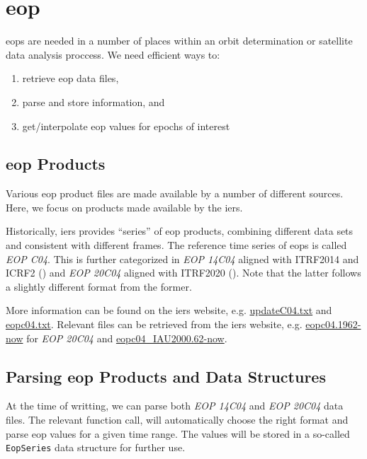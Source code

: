 \section{\gls{eop}}\label{sec:eop}

\glspl{eop} are needed in a number of places within an orbit determination or 
satellite data analysis proccess. We need efficient ways to:
\begin{enumerate}
  \item retrieve \gls{eop} data files, 
  \item parse and store information, and 
  \item get/interpolate \gls{eop} values for epochs of interest
\end{enumerate}

\subsection{\gls{eop} Products}\label{ssec:eop-products}

Various \gls{eop} product files are made available by a number of different 
sources. Here, we focus on products made available by the \gls{iers}. 

Historically, \gls{iers} provides ``series'' of \gls{eop} products, combining 
different data sets and consistent with different frames. The reference time 
series of \glspl{eop} is called \emph{EOP C04}. This is further categorized in 
\emph{EOP 14C04} aligned with ITRF2014 and ICRF2 (\cite{Bizouard2019}) and 
\emph{EOP 20C04} aligned with ITRF2020 (\cite{iersmail471}). Note that the latter 
follows a slightly different format from the former.

More information can be found on the \gls{iers} website, e.g. 
\href{https://hpiers.obspm.fr/iers/eop/eopc04_14/updateC04.txt}{updateC04.txt} 
and \href{https://hpiers.obspm.fr/iers/eop/eopc04/eopc04.txt}{eopc04.txt}. 
Relevant files can be retrieved from the \gls{iers} website, e.g. 
\href{https://hpiers.obspm.fr/iers/eop/eopc04/eopc04.1962-now}{eopc04.1962-now} for 
\emph{EOP 20C04} and \href{https://hpiers.obspm.fr/iers/eop/eopc04_14/eopc04_IAU2000.62-now}{eopc04\_IAU2000.62-now}.

\subsection{Parsing \gls{eop} Products and Data Structures}\label{ssec:parsing-eop-products-and-data-structures}

At the time of writting, we can parse both \emph{EOP 14C04} and \emph{EOP 20C04} data files. 
The relevant function call, will automatically choose the right format and parse 
\gls{eop} values for a given time range. The values will be stored in a so-called 
\texttt{EopSeries} data structure for further use.

